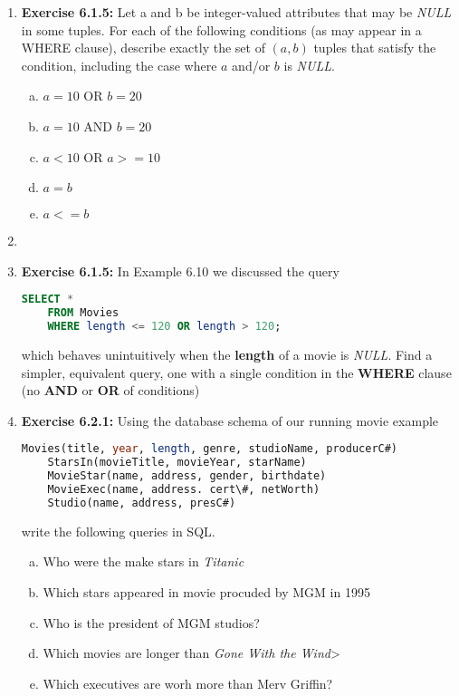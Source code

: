 \documentclass[12pt]{article}
\begin{document}
\begin{enumerate}[1.]
    \item \textbf{Exercise 6.1.5:} Let a and b be integer-valued attributes that
    may be \textit{NULL} in some tuples. For each of the following conditions
    (as may appear in a WHERE clause), describe exactly the set of $(a, b)$ tuples
    that satisfy the condition, including the case where $a$ and/or $b$ is \textit{NULL}.

    \bigskip

    \begin{enumerate}[a)]
        \item $a = 10$ OR $b = 20$
        \item $a = 10$ AND $b = 20$
        \item $a < 10$ OR $a >= 10$
        \item $a = b$
        \item $a <= b$
    \end{enumerate}

    \item

    \item \textbf{Exercise 6.1.5:} In Example 6.10 we discussed the query

    \begin{lstlisting}[language=SQL]
    SELECT *
    FROM Movies
    WHERE length <= 120 OR length > 120;
    \end{lstlisting}

    \bigskip

    which behaves unintuitively when the \textbf{length} of a movie is \textit{NULL}.
    Find a simpler, equivalent query, one with a single condition in the \textbf{WHERE} clause
    (no \textbf{AND} or \textbf{OR} of conditions)

    \item \textbf{Exercise 6.2.1:} Using the database schema of our running movie
    example

    \begin{lstlisting}[language=SQL]
    Movies(title, year, length, genre, studioName, producerC#)
    StarsIn(movieTitle, movieYear, starName)
    MovieStar(name, address, gender, birthdate)
    MovieExec(name, address. cert\#, netWorth)
    Studio(name, address, presC#)
    \end{lstlisting}

    \bigskip

    write the following queries in SQL.

    \bigskip

    \begin{enumerate}[a)]
        \item Who were the make stars in \textit{Titanic}
        \item Which stars appeared in movie procuded by MGM in 1995
        \item Who is the president of MGM studios?
        \item Which movies are longer than \textit{Gone With the Wind}>
        \item Which executives are worh more than Merv Griffin?
    \end{enumerate}

\end{enumerate}
\end{document}
